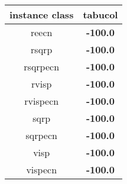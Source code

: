 \begin{tabular}{c|c}
instance class & tabucol \\ 
\hline
reecn        & {\bf -100.0} \\ 
rsqrp        & {\bf -100.0} \\ 
rsqrpecn     & {\bf -100.0} \\ 
rvisp        & {\bf -100.0} \\ 
rvispecn     & {\bf -100.0} \\ 
sqrp         & {\bf -100.0} \\ 
sqrpecn      & {\bf -100.0} \\ 
visp         & {\bf -100.0} \\ 
vispecn      & {\bf -100.0} \\ 
\end{tabular}